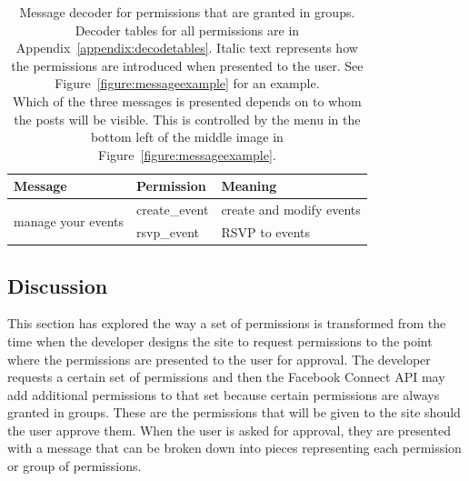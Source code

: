 \documentclass[10pt]{sig-alternate-10pt}
\begin{document}
\begin{table}[htbp]
\begin{tabular}{|l|l|l|}
    \textbf{Message}                                                                                                                                                                                                                                                 & \textbf{Permission} & \textbf{Meaning}                                                                                                                          \\ \hline
    \multirow{2}{*}{manage your events}                                                                                                                                                                                                                              & create\_event       & create and modify events                                                                                                                  \\ \cline{2-3} 
    & rsvp\_event         & RSVP to events                                                                                                                            \\ \hline
  \end{tabular}
  \caption{Message decoder for permissions that are granted in groups. Decoder tables for all permissions are in Appendix~\ref{appendix:decodetables}. Italic text represents how the permissions are introduced when presented to the user. See Figure~\ref{figure:messageexample} for an example. \\ \footnotesize *Which of the three messages is presented depends on to whom the posts will be visible. This is controlled by the menu in the bottom left of the middle image in Figure~\ref{figure:messageexample}.}
  \label{table:messagegrouped}
\end{table}

\subsection{Discussion}
\label{sec:investigationdiscussion}

This section has explored the way a set of permissions is transformed from the time when the developer designs the site to request permissions to the point where the permissions are presented to the user for approval. The developer requests a certain set of permissions and then the Facebook Connect API may add additional permissions to that set because certain permissions are always granted in groups. These are the permissions that will be given to the site should the user approve them. When the user is asked for approval, they are presented with a message that can be broken down into pieces representing each permission or group of permissions.
\end{document}
